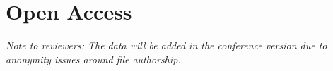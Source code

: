 \documentclass[twoside,letterpaper]{soups}
\begin{document}
\section{Open Access}\label{open_access}


\emph{Note to reviewers: The data will be added in the conference version due to anonymity issues around file authorship.}





%

\end{document}
